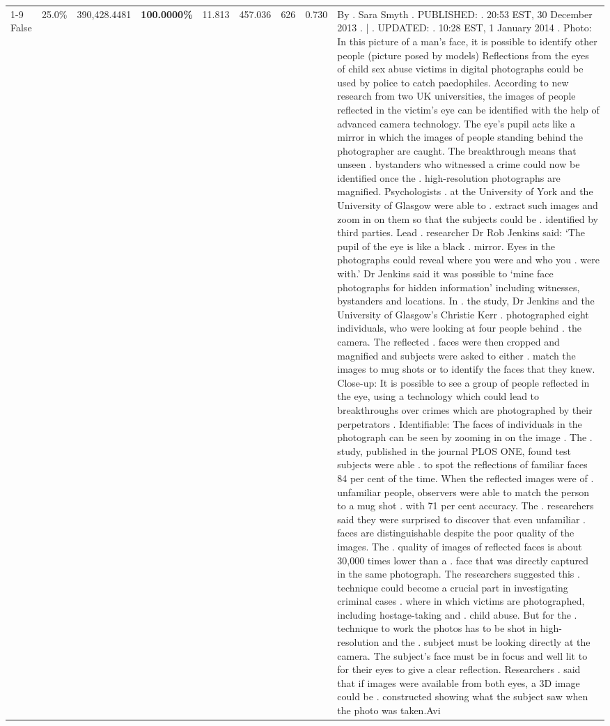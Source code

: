 \begin{table}[H]
\begin{tabular}{lllrlllll}
\cline{1-9}
False & 25.0\% & 390,428.4481 & \bfseries \color{red} 100.0000\% & 11.813 & 457.036 & 626 & 0.730 & By . Sara Smyth . PUBLISHED: . 20:53 EST, 30 December 2013 . | . UPDATED: . 10:28 EST, 1 January 2014 . Photo: In this picture of a man's face, it is possible to identify other people (picture posed by models) Reflections from the eyes of child sex abuse victims in digital photographs could be used by police to catch paedophiles. According to new research from two UK universities, the images of people reflected in the victim's eye can be identified with the help of advanced camera technology. The eye's pupil acts like a mirror in which the images of people standing behind the photographer are caught. The breakthrough means that unseen . bystanders who witnessed a crime could now be identified once the . high-resolution photographs are magnified. Psychologists . at the University of York and the University of Glasgow were able to . extract such images and zoom in on them so that the subjects could be . identified by third parties. Lead . researcher Dr Rob Jenkins said: ‘The pupil of the eye is like a black . mirror. Eyes in the photographs could reveal where you were and who you . were with.' Dr Jenkins said it was possible to ‘mine face photographs for hidden information' including witnesses, bystanders and locations. In . the study, Dr Jenkins and the University of Glasgow's Christie Kerr . photographed eight individuals, who were looking at four people behind . the camera. The reflected . faces were then cropped and magnified and subjects were asked to either . match the images to mug shots or to identify the faces that they knew. Close-up: It is possible to see a group of people reflected in the eye, using a technology which could lead to breakthroughs over crimes which are photographed by their perpetrators . Identifiable: The faces of individuals in the photograph can be seen by zooming in on the image . The . study, published in the journal PLOS ONE, found test subjects were able . to spot the reflections of familiar faces 84 per cent of the time. When the reflected images were of . unfamiliar people, observers were able to match the person to a mug shot . with 71 per cent accuracy. The . researchers said they were surprised to discover that even unfamiliar . faces are distinguishable despite the poor quality of the images. The . quality of images of reflected faces is about 30,000 times lower than a . face that was directly captured in the same photograph. The researchers suggested this . technique could become a crucial part in investigating criminal cases . where in which victims are photographed, including hostage-taking and . child abuse. But for the . technique to work the photos has to be shot in high-resolution and the . subject must be looking directly at the camera. The subject's face must be in focus and well lit to for their eyes to give a clear reflection. Researchers . said that if images were available from both eyes, a 3D image could be . constructed showing what the subject saw when the photo was taken.Avi \\

\end{tabular}
\end{table}
